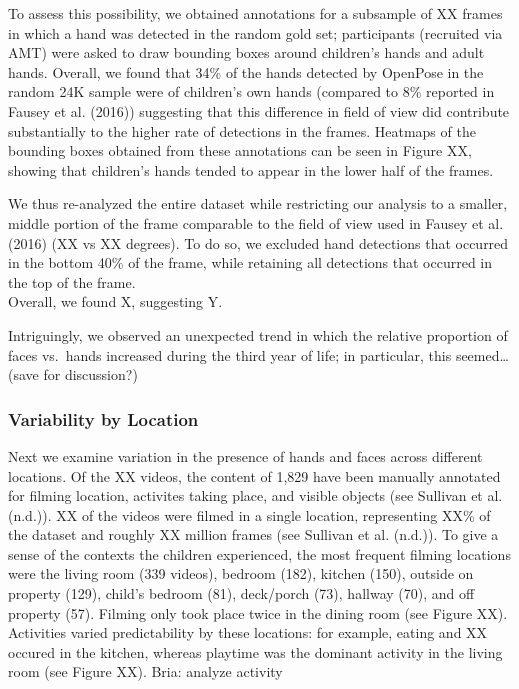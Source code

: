 \documentclass[10pt, letterpaper]{article}
\begin{document}
To assess this possibility, we obtained annotations for a subsample of
XX frames in which a hand was detected in the random gold set;
participants (recruited via AMT) were asked to draw bounding boxes
around children's hands and adult hands. Overall, we found that 34\% of
the hands detected by OpenPose in the random 24K sample were of
children's own hands (compared to 8\% reported in Fausey et al. (2016))
suggesting that this difference in field of view did contribute
substantially to the higher rate of detections in the frames. Heatmaps
of the bounding boxes obtained from these annotations can be seen in
Figure XX, showing that children's hands tended to appear in the lower
half of the frames.

We thus re-analyzed the entire dataset while restricting our analysis to
a smaller, middle portion of the frame comparable to the field of view
used in Fausey et al. (2016) (XX vs XX degrees). To do so, we excluded
hand detections that occurred in the bottom 40\% of the frame, while
retaining all detections that occurred in the top of the frame.\\
Overall, we found X, suggesting Y.

Intriguingly, we observed an unexpected trend in which the relative
proportion of faces vs.~hands increased during the third year of life;
in particular, this seemed\ldots{}(save for discussion?)

\hypertarget{variability-by-location}{%
\subsubsection{Variability by Location}\label{variability-by-location}}

Next we examine variation in the presence of hands and faces across
different locations. Of the XX videos, the content of 1,829 have been
manually annotated for filming location, activites taking place, and
visible objects (see Sullivan et al. (n.d.)). XX of the videos were
filmed in a single location, representing XX\% of the dataset and
roughly XX million frames (see Sullivan et al. (n.d.)). To give a sense
of the contexts the children experienced, the most frequent filming
locations were the living room (339 videos), bedroom (182), kitchen
(150), outside on property (129), child's bedroom (81), deck/porch (73),
hallway (70), and off property (57). Filming only took place twice in
the dining room (see Figure XX). Activities varied predictability by
these locations: for example, eating and XX occured in the kitchen,
whereas playtime was the dominant activity in the living room (see
Figure XX). Bria: analyze activity
\end{document}
